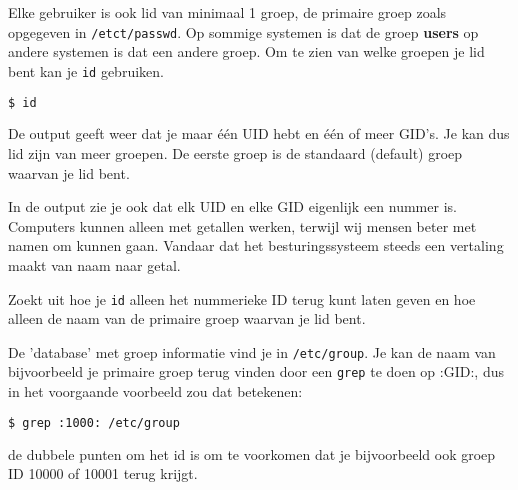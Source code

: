 Elke gebruiker is ook lid van minimaal 1 groep, de primaire groep zoals opgegeven in \texttt{/etct/passwd}. Op sommige systemen is dat de groep \textbf{users} op andere systemen is dat een andere groep. Om te zien van welke groepen je lid bent kan je \texttt{id} gebruiken.
\begin{lstlisting}[language=bash]
$ id
\end{lstlisting}
De output geeft weer dat je maar \'e\'en UID hebt en \'e\'en of meer GID's. Je kan dus lid zijn van meer groepen. De eerste groep is de standaard (default) groep waarvan je lid bent.

In de output zie je ook dat elk UID en elke GID eigenlijk een nummer is. Computers kunnen alleen met getallen werken, terwijl wij mensen beter met namen om kunnen gaan. Vandaar dat het besturingssysteem steeds een vertaling maakt van naam naar getal.

Zoekt uit hoe je \texttt{id} alleen het nummerieke ID terug kunt laten geven en hoe alleen de naam van de primaire groep waarvan je lid bent.

De 'database' met groep informatie vind je in \texttt{/etc/group}. Je kan de naam van bijvoorbeeld je primaire groep terug vinden door een \texttt{grep} te doen op :GID:, dus in het voorgaande voorbeeld zou dat betekenen:
\begin{lstlisting}[language=bash]
$ grep :1000: /etc/group
\end{lstlisting}
de dubbele punten om het id is om te voorkomen dat je bijvoorbeeld ook groep ID 10000 of 10001 terug krijgt.
